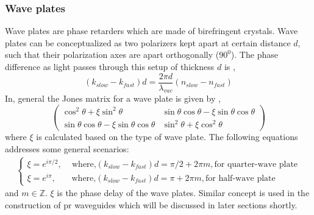\documentclass[../report.tex]{subfiles}
\begin{document}
		\subsubsection*{Wave plates}
Wave plates are phase retarders which are made of birefringent crystals. Wave plates can be conceptualized as two polarizers kept apart at certain distance $d$, such that their polarization axes are apart orthogonally ($90^{0}$). The phase difference as light passes through this setup of thickness $d$ is \cite{peatross_physics_2015},
\begin{equation}\label{eq:jones_matrix_wp1}
\left(k_{slow}-k_{fast}\right)d = \dfrac {2\pi d} {\lambda_{vac} }\left( n_{slow}-n_{fast}\right) 
\end{equation}
In, general the Jones matrix for a wave plate is given by \cite{peatross_physics_2015},
\begin{equation}\label{eq:jones_matrix_wp2}
\left( \begin{matrix} 
\cos ^{2}\theta +\xi \sin ^{2}\theta & \sin \theta \cos \theta -\xi \sin \theta \cos \theta\\ 
\sin \theta \cos \theta -\xi \sin \theta \cos \theta & \sin ^{2}\theta +\xi \cos ^{2}\theta
\end{matrix} \right) 
\end{equation}
where $\xi$ is calculated based on the type of wave plate. The following equations addresses some general scenarios:
\begin{equation}\label{eq:jones_matrix_wp3}
\begin{aligned}
\begin{cases} 
\xi = e^{i\pi/2}, \,\quad \text{where,} \left(k_{slow}-k_{fast}\right)d = \pi/2 + 2\pi m, \text{for quarter-wave plate}\\ 
\xi = e^{i\pi},  \;\;\;\quad \text{where,} \left(k_{slow}-k_{fast}\right)d = \pi + 2\pi m, \text{for half-wave plate}
\end{cases}
\end{aligned}
\end{equation}
and $m \in \mathbb{Z}$. $\xi$ is the phase delay of the wave plates. Similar concept is used in the construction of \gls{pr} waveguides which will be discussed in later sections shortly.
 		
\end{document}
